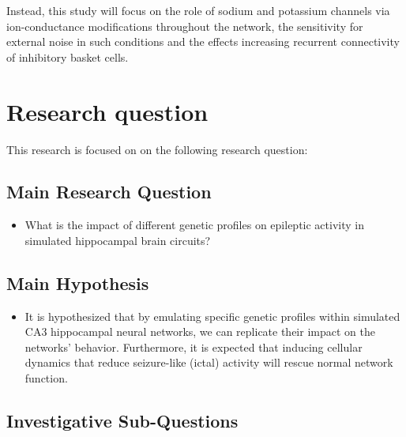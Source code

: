 Instead, this study will focus on the role of sodium and potassium channels via ion-conductance modifications throughout the network,
the sensitivity for external noise in such conditions and the effects increasing recurrent connectivity of inhibitory basket cells.
\pagebreak
\section{Research question}
This research is focused on on the following research question:

\subsection*{Main Research Question}

\begin{itemize}
    \item What is the impact of different genetic profiles on epileptic activity in simulated hippocampal brain circuits?
\end{itemize}

\subsection*{Main Hypothesis}

\begin{itemize}
    \item It is hypothesized that by emulating specific genetic profiles within simulated CA3 hippocampal neural networks,
          we can replicate their impact on the networks' behavior. Furthermore, it is expected that inducing cellular dynamics that
          reduce seizure-like (ictal) activity will rescue normal network function.
\end{itemize}

\subsection*{Investigative Sub-Questions}

